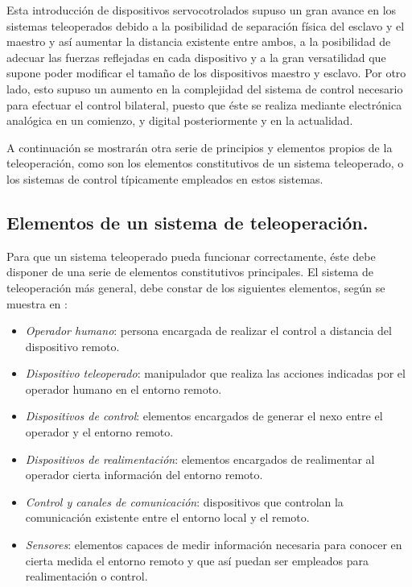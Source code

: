 Esta introducción de dispositivos servocotrolados supuso un gran avance en los sistemas teleoperados debido a la posibilidad de separación física del esclavo y el maestro y así aumentar la distancia existente entre ambos, a la posibilidad de adecuar las fuerzas reflejadas en cada dispositivo y a la gran versatilidad que supone poder modificar el tamaño de los dispositivos maestro y esclavo. Por otro lado, esto supuso un aumento en la complejidad del sistema de control necesario para efectuar el control bilateral, puesto que éste se realiza mediante electrónica analógica en un comienzo, y digital posteriormente y en la actualidad. \par 

A continuación se mostrarán otra serie de principios y elementos propios de la teleoperación, como son los elementos constitutivos de un sistema teleoperado, o los sistemas de control típicamente empleados en estos sistemas. \par 

\subsection{Elementos de un sistema de teleoperación.}

Para que un sistema teleoperado pueda funcionar correctamente, éste debe disponer de una serie de elementos constitutivos principales. El sistema de teleoperación más general, debe constar de los siguientes elementos, según se muestra en \cite{barrientos2007fundamentos}:

\begin{itemize}

\item \emph{Operador humano}: persona encargada de realizar el control a distancia del dispositivo remoto. \par 

\item \emph{Dispositivo teleoperado}: manipulador que realiza las acciones indicadas por el operador humano en el entorno remoto. \par 

\item \emph{Dispositivos de control}: elementos encargados de generar el nexo entre el operador y el entorno remoto. \par 

\item \emph{Dispositivos de realimentación}: elementos encargados de realimentar al operador cierta información del entorno remoto. \par 
 
\item \emph{Control y canales de comunicación}: dispositivos que controlan la comunicación existente entre el entorno local y el remoto. \par 

\item \emph{Sensores}: elementos capaces de medir información necesaria para conocer en cierta medida el entorno remoto y que así puedan ser empleados para realimentación o control. \par 

\end{itemize}

